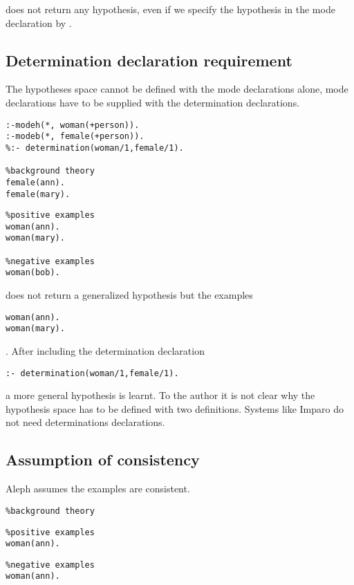 does not return any hypothesis, even if we specify the hypothesis in the mode declaration by .

\subsection{Determination declaration requirement}\label{subsec:aleph_determination_declaration_requirement}
The hypotheses space cannot be defined with the mode declarations alone, mode declarations have to be supplied with the determination declarations.

\begin{minipage}[t]{.50\textwidth}
\begin{lstlisting}
:-modeh(*, woman(+person)).
:-modeb(*, female(+person)).
%:- determination(woman/1,female/1).

%background theory
female(ann).
female(mary).
\end{lstlisting}
\end{minipage}
\begin{minipage}[t]{.30\textwidth}
\begin{lstlisting}
%positive examples
woman(ann).
woman(mary).

%negative examples
woman(bob).
\end{lstlisting}
\end{minipage}

does not return a generalized hypothesis but the examples
\begin{lstlisting}
woman(ann).
woman(mary).
\end{lstlisting}.
After including the determination declaration
\begin{lstlisting}
:- determination(woman/1,female/1).
\end{lstlisting}
a more general hypothesis  is learnt. To the author it is not clear why the hypothesis space has to be defined with two definitions. Systems like Imparo do not need determinations declarations.

\subsection{Assumption of consistency}
Aleph assumes the examples are consistent.

\begin{minipage}[t]{.30\textwidth}
\begin{lstlisting}
%background theory
\end{lstlisting}
\end{minipage}
\begin{minipage}[t]{.30\textwidth}
\begin{lstlisting}
%positive examples
woman(ann).
\end{lstlisting}
\end{minipage}
\begin{minipage}[t]{.30\textwidth}
\begin{lstlisting}
%negative examples
woman(ann).
\end{lstlisting}
\end{minipage}

